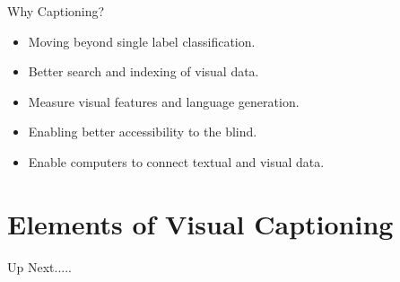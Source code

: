 \documentclass{beamer}
\begin{document}
\begin{frame}{Why Captioning?}
\begin{itemize}
\item Moving beyond single label classification.
\item Better search and indexing of visual data.
\item Measure visual features and language generation.
\item Enabling better accessibility to the blind.
\item Enable computers to connect textual and visual data. 
\end{itemize}
\end{frame}

\section{Elements of Visual Captioning}
\begin{frame}{Up Next.....}
\tableofcontents[currentsection] 
\end{frame}
\end{document}
